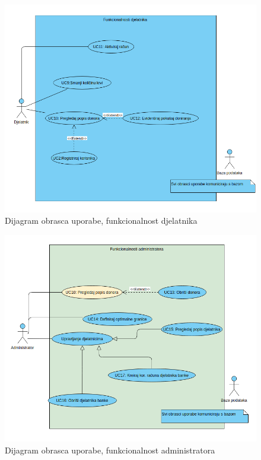 \begin{figure}[H]
			\includegraphics[scale=0.6]{dijagrami/Funkcionalnosti_djelatnika_donora.png} %
			\centering
			\caption{Dijagram obrasca uporabe, funkcionalnost djelatnika}
			\label{fig:Funkcionalnosti_djelatnika_donora}
\end{figure}

\begin{figure}[H]
			\includegraphics[scale=0.6]{dijagrami/Funkcionalnosti_admina.png} %
			\centering
			\caption{Dijagram obrasca uporabe, funkcionalnost administratora}
			\label{fig:Funkcionalnosti_admina}
\end{figure}

